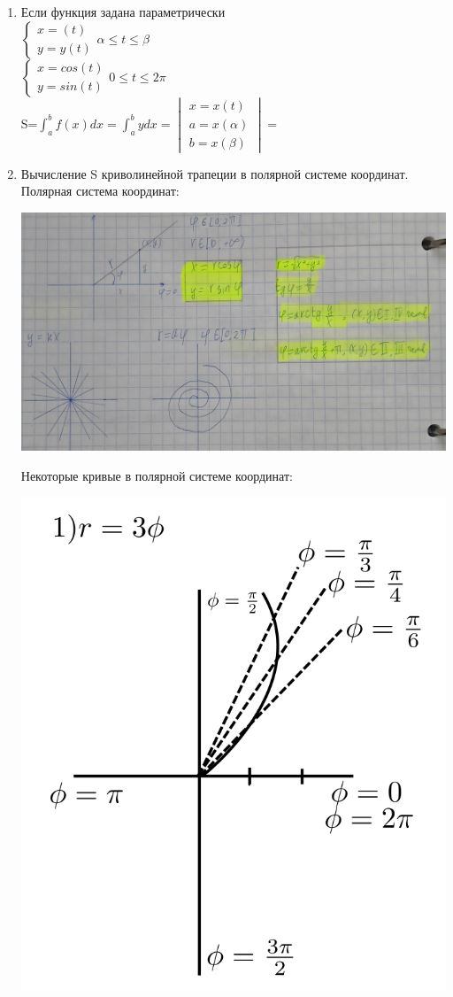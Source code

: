 \documentclass[12pt]{article}
\let\ORIincludegraphics\includegraphics
\renewcommand{\includegraphics}[2][]{\ORIincludegraphics[scale=0.65,#1]{#2}}
\begin{document}
\begin{enumerate}
        \item Если функция задана параметрически\\
        $\begin{cases}
            x=(t)\\
            y=y(t)
        \end{cases} \alpha \leq t \leq \beta$\\
        $\begin{cases}
            x=cos(t)\\
            y=sin(t)
        \end{cases} 0 \leq t \leq 2 \pi$\\
        S=$\int_{a}^{b} f(x)dx = \int_{a}^{b} ydx=
        \begin{vmatrix}
            x=x(t)\\
            a=x(\alpha)\\
            b=x(\beta)
        \end{vmatrix} = $
        \item Вычисление S криволинейной трапеции в полярной системе координат. \\ Полярная система координат:
        \begin{center}
            \includegraphics[width=0.9\linewidth]{6.9.3.png}\\
        \end{center}
        Некоторые кривые в полярной системе координат:
        \begin{center}
            \includegraphics[width=0.7\linewidth]{6.9.4.png}\\

\end{center}
\end{enumerate}
\end{document}
